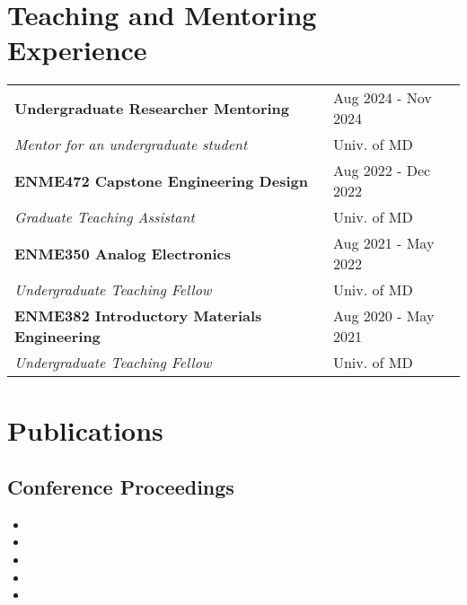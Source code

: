 \documentclass[letterpaper, 11pt]{article}
\begin{document}
\section{Teaching and Mentoring Experience}
\begin{table}[H]
    \centering
    \begin{tabular}{L{0.7\textwidth} R{0.2\textwidth}}
    	\textbf{Undergraduate Researcher Mentoring} & Aug 2024 - Nov 2024 \\
    	\hspace{5pt} \textit{Mentor for an undergraduate student} & Univ. of MD \\

        \textbf{ENME472 Capstone Engineering Design} & Aug 2022 - Dec 2022 \\
        \hspace{5pt} \textit{Graduate Teaching Assistant} &  Univ. of MD\\

        \textbf{ENME350 Analog Electronics} & Aug 2021 - May 2022 \\
        \hspace{5pt} \textit{Undergraduate Teaching Fellow} & Univ. of MD\\


        \textbf{ENME382 Introductory Materials Engineering} & Aug 2020 - May 2021 \\
        \hspace{5pt} \textit{Undergraduate Teaching Fellow} & Univ. of MD\\

    \end{tabular}
\end{table}

\section{Publications}
\subsection{Conference Proceedings}
\begin{itemize}
	\item {}
    \item {}
    \item {}
    \item {}
    \item {}
\end{itemize}
\end{document}
